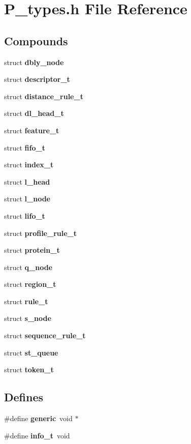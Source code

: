 \section{P\_\-types.h File Reference}
\label{P__types_8h}
\subsection*{Compounds}
\begin{CompactItemize}
\item 
struct {\bf dbly\_\-node}
\item 
struct {\bf descriptor\_\-t}
\item 
struct {\bf distance\_\-rule\_\-t}
\item 
struct {\bf dl\_\-head\_\-t}
\item 
struct {\bf feature\_\-t}
\item 
struct {\bf fifo\_\-t}
\item 
struct {\bf index\_\-t}
\item 
struct {\bf l\_\-head}
\item 
struct {\bf l\_\-node}
\item 
struct {\bf lifo\_\-t}
\item 
struct {\bf profile\_\-rule\_\-t}
\item 
struct {\bf protein\_\-t}
\item 
struct {\bf q\_\-node}
\item 
struct {\bf region\_\-t}
\item 
struct {\bf rule\_\-t}
\item 
struct {\bf s\_\-node}
\item 
struct {\bf sequence\_\-rule\_\-t}
\item 
struct {\bf st\_\-queue}
\item 
struct {\bf token\_\-t}
\end{CompactItemize}
\subsection*{Defines}
\begin{CompactItemize}
\item 
\#define {\bf generic}\ void $\ast$
\item 
\#define {\bf info\_\-t}\ void
\end{CompactItemize}

